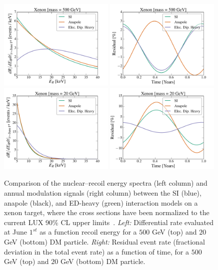 \documentclass[11pt]{article}
\begin{document}
\begin{figure}
\centering
\includegraphics[width=0.49\textwidth, trim=0.cm 0.0cm 0.cm 0.0cm,clip=true]{plots/RecoilComparison_500GeV.pdf}
\includegraphics[width=0.49\textwidth, trim=0.cm 0.0cm 0.cm 0.0cm,clip=true]{plots/Xenon_SIvsAnapole_500GeV_Residual_Theory.pdf}
\includegraphics[width=0.49\textwidth, trim=0.cm 0.0cm 0.cm 0.0cm,clip=true]{plots/RecoilComparison_20GeV.pdf}
\includegraphics[width=0.49\textwidth, trim=0.cm 0.0cm 0.cm 0.0cm,clip=true]{plots/Xenon_SIvsAnapole_20GeV_Residual_Theory.pdf}
\caption{\label{fig:diff_rate_comp}
Comparison of the nuclear--recoil energy spectra (left column) and annual modulation signals (right column) between the SI (blue), anapole (black), and ED-heavy (green) interaction models on a xenon target, where the cross sections have been normalized to the current LUX 90\% CL upper limits~\cite{Akerib:2016vxi}. \emph{Left:} Differential rate evaluated at June $1^{st}$ as a function recoil energy for a $500$ GeV (top) and $20$ GeV (bottom) DM particle. \emph{Right:} Residual event rate (fractional deviation in the total event rate) as a function of time, for a $500$ GeV (top) and $20$ GeV (bottom) DM particle. }
\end{figure}
\end{document}
